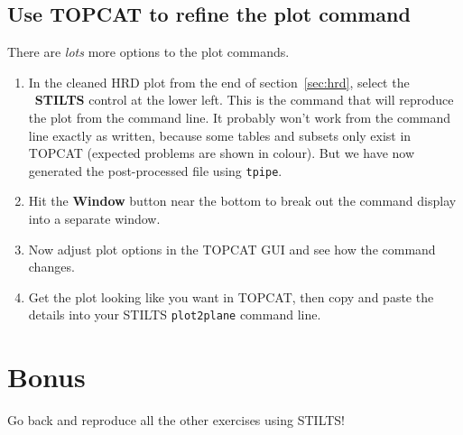 \documentclass{article}
\newcommand{\buttimg}[1]
           {\mbox{\vtop{\vskip-2ex\hbox{\texttt{[image: \#1]}}}}}
\newcommand{\winfig}[2]
           {\vspace*{-0.5cm}
            \hspace*{0.5cm}\mbox{\vtop{\hbox{\texttt{[image: \#2]}}}}}
\newcommand{\lab}[1]{{\bf #1}}
\newcommand{\ma}[2]{\buttimg{#1}~\lab{#2}}
\begin{document}
\begin{minipage}[t]{11cm}
  \vspace*{2cm}
  \subsection{Use TOPCAT to refine the plot command}
  There are {\em lots\/} more options to the plot commands.

  \begin{enumerate}
  \item In the cleaned HRD plot from the end of section~\ref{sec:hrd},
        select the \ma{stilts.png}{STILTS} control at the lower left.
        This is the command that will reproduce the plot from the command line.
        It probably won't work from the command line exactly as written,
        because some tables and subsets only exist in TOPCAT
        (expected problems are shown in colour).
        But we have now generated the post-processed file using {\tt tpipe}.
  \item Hit the \lab{Window} button near the bottom to break out
        the command display into a separate window.
  \item Now adjust plot options in the TOPCAT GUI and see how the command
        changes.
  \item Get the plot looking like you want in TOPCAT, then copy and paste
        the details into your STILTS {\tt plot2plane} command line.
  \end{enumerate}
\end{minipage}
\begin{minipage}[t]{8cm}
  \winfig{width=8cm}{hrd_stilts.png}
\end{minipage}


\newpage


\section*{Bonus}

Go back and reproduce all the other exercises using STILTS!
\end{document}
